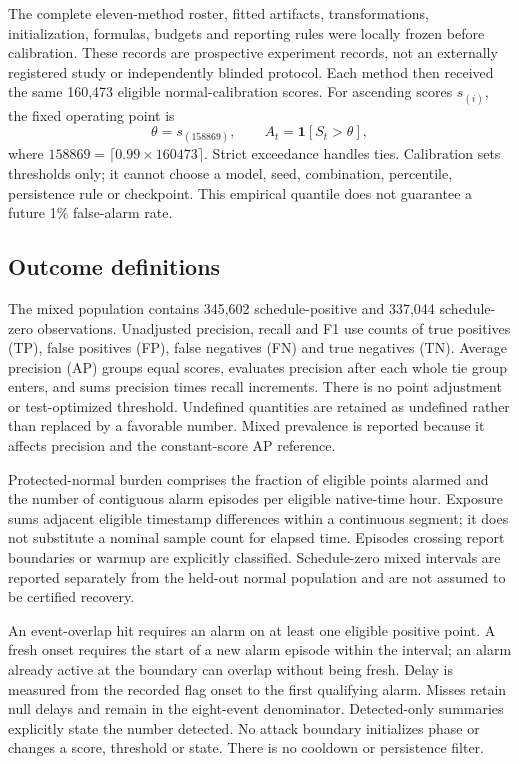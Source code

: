 The complete eleven-method roster, fitted artifacts, transformations, initialization, formulas, budgets and reporting rules were locally frozen before calibration. These records are prospective experiment records, not an externally registered study or independently blinded protocol. Each method then received the same 160,473 eligible normal-calibration scores. For ascending scores $s_{(i)}$, the fixed operating point is
\begin{equation}
 \theta=s_{(158869)},\qquad A_t=\mathbf 1[S_t>\theta],
 \label{eq:threshold}
\end{equation}
where $158869=\lceil0.99\times160473\rceil$. Strict exceedance handles ties. Calibration sets thresholds only; it cannot choose a model, seed, combination, percentile, persistence rule or checkpoint. This empirical quantile does not guarantee a future 1\% false-alarm rate.

\subsection{Outcome definitions}
The mixed population contains 345,602 schedule-positive and 337,044 schedule-zero observations. Unadjusted precision, recall and F1 use counts of true positives (TP), false positives (FP), false negatives (FN) and true negatives (TN). Average precision (AP) groups equal scores, evaluates precision after each whole tie group enters, and sums precision times recall increments. There is no point adjustment or test-optimized threshold. Undefined quantities are retained as undefined rather than replaced by a favorable number. Mixed prevalence is reported because it affects precision and the constant-score AP reference.

Protected-normal burden comprises the fraction of eligible points alarmed and the number of contiguous alarm episodes per eligible native-time hour. Exposure sums adjacent eligible timestamp differences within a continuous segment; it does not substitute a nominal sample count for elapsed time. Episodes crossing report boundaries or warmup are explicitly classified. Schedule-zero mixed intervals are reported separately from the held-out normal population and are not assumed to be certified recovery.

An event-overlap hit requires an alarm on at least one eligible positive point. A fresh onset requires the start of a new alarm episode within the interval; an alarm already active at the boundary can overlap without being fresh. Delay is measured from the recorded flag onset to the first qualifying alarm. Misses retain null delays and remain in the eight-event denominator. Detected-only summaries explicitly state the number detected. No attack boundary initializes phase or changes a score, threshold or state. There is no cooldown or persistence filter.

